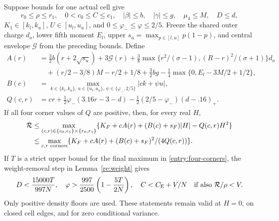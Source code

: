 \begin{lemma}\label{entry:cell-theorem}\label{entry:corners}
Suppose bounds for one actual cell give
\[
 r_0\le\rho\le r_1,\quad0<c_0\le C\le c_1,\quad
 |\beta|\le b,\quad |\gamma|\le g,\quad \mu_4\le M,\quad D\le d,
\]
$K_1\in[k_l,k_u]$, $U\in[u_l,u_u]$, and
$0\le\varphi_-\le\varphi\le2/5$. Freeze the shared outer charge $d_o$,
lower fifth moment $E_l$, upper $s_u=\max_{p\in[l,u]}p(1-p)$, and
central envelope $\mathcal G$ from the preceding bounds.
Define
\begin{align*}
 A(r)&=\tfrac32 b(r+2\sqrt{s_u})+3\mathcal G(r)
 +\tfrac38\max\{r^2/(\sigma-1),(R-r)^2/(\sigma+1)\}d_o\\
 &\quad +(r/2-3/8)M-r/2+1/8+\tfrac32bg
 -\tfrac14\max\{0,E_l-3M/2+1/2\},\\
 B(c)&=\max_{k\in\{k_l,k_u\},\,u\in\{u_l,u_u\},\,
                      \psi\in\{\varphi_-,2/5\}}|ck+\psi u|,\\
 Q(c,r)&=cr+\tfrac12\varphi_-(3.16r-3-d)
       -\tfrac12(2/5-\varphi_-)(d-.16)_+.
\end{align*}
If all four corner values of $Q$ are positive, then, for every real $H$,
\begin{align}
 \mathcal R&\le\max_{(c,r)\in\{c_0,c_1\}\times\{r_0,r_1\}}
       \{K_F+cA(r)+(B(c)+s_F)|H|-Q(c,r)H^2\}\notag\\
 &\le\max_{c,r\text{ corners}}
       \{K_F+cA(r)+(B(c)+s_F)^2/(4Q(c,r))\}.           \label{entry:four-corners}
\end{align}
If $T$ is a strict upper bound for the final maximum in
\eqref{entry:four-corners}, the weight-removal step in
Lemma~\ref{re:weight} gives
\begin{equation}\label{entry:feedback-values}
 D<\frac{15000T}{997N},\quad
 \varphi>\frac{997}{2500}\left(1-\frac{5T}{2N}\right),\quad
 C<C_{\mathrm E}+V/N\quad\text{if also }\mathcal R/\rho<V.
\end{equation}
Only positive density floors are used. These statements remain valid at
$H=0$, on closed cell edges, and for zero conditional variance.
\end{lemma}
